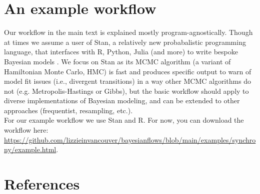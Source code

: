 \documentclass[11pt]{article}
\begin{document}

\section*{An example workflow}

Our workflow in the main text is explained mostly program-agnostically. Though at times we assume a user of \textsf{Stan}, a relatively new probabalistic programming language, that interfaces with \textsf{R, Python, Julia} (and more) to write bespoke Bayesian models \citep{Carpenter:2017stan}. We focus on \textsf{Stan} as its MCMC algorithm (a variant of Hamiltonian Monte Carlo, HMC) is fast and produces specific output to warn of model fit issues (i.e., divergent transitions) in a way other MCMC algorithms do not (e.g. Metropolis-Hastings or Gibbs), but the basic workflow should apply to diverse implementations of Bayesian modeling, and can be extended to other approaches (frequentist, resampling, etc.). \\ 

For our example workflow we use \textsf{Stan} and \textsf{R}. For now, you can download the workflow here:
\url{https://github.com/lizzieinvancouver/bayesianflows/blob/main/examples/synchrony/example.html}.

\section*{References}
\vspace{-5ex}

\end{document}

